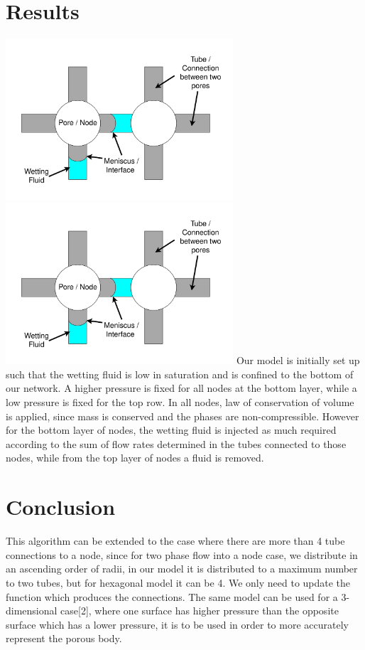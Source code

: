 \documentclass[12pt, a4paper]{article}
\begin{document}
\section{Results}
\includegraphics[height=6cm]{fig_descp-of-model}
\includegraphics[height=6cm]{fig_descp-of-model}
Our model is initially set up such that the wetting fluid is low in saturation and is confined to the bottom of our network. A higher pressure is fixed for all nodes at the bottom layer, while a  low pressure is fixed for the top row. In all nodes, law of conservation of volume is applied, since mass is conserved and the phases are non-compressible. However for the bottom layer of nodes, the wetting fluid is injected as much required according to the sum of flow rates determined in the tubes connected to those nodes, while from the top layer of nodes a fluid is removed.
\section{Conclusion}
This algorithm can be extended to the case where there are more than 4 tube connections to a node, since for two phase flow into a node case, we distribute in an ascending order of radii, in our model it is distributed to a maximum number to two tubes, but for hexagonal model it can be 4. We only need to update the function which produces the connections. The same model can be used for a 3-dimensional case[2], where one surface has higher pressure than the opposite surface which has a lower pressure, it is to be used in order to more accurately represent the porous body.
\end{document}
